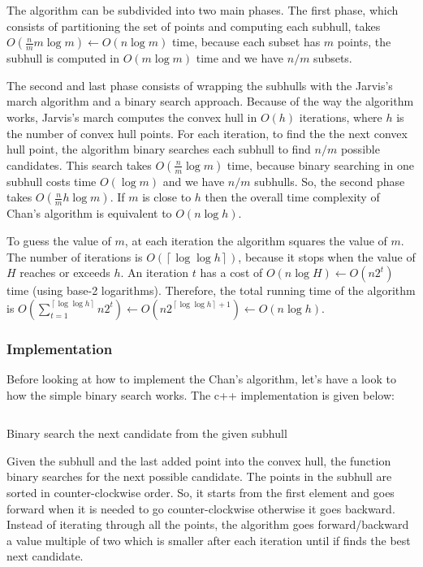 \documentclass{article}
\begin{document}
The algorithm can be subdivided into two main phases. The first phase, which consists of partitioning the set of points and computing each subhull, takes $O(\frac{n}{m}m\log{m}) \gets O(n\log{m})$ time, because each subset has $m$ points, the subhull is computed in $O(m\log{m})$ time and we have $n/m$ subsets.

The second and last phase consists of wrapping the subhulls with the Jarvis's march algorithm and a binary search approach. Because of the way the algorithm works, Jarvis's march computes the convex hull in $O(h)$ iterations, where $h$ is the number of convex hull points. For each iteration, to find the the next convex hull point, the algorithm binary searches each subhull to find $n/m$ possible candidates. This search takes $O(\frac{n}{m}\log{m})$ time, because binary searching in one subhull costs time $O(\log{m})$ and we have $n/m$ subhulls. So, the second phase takes $O(\frac{n}{m}h\log{m})$. If $m$ is close to $h$ then the overall time complexity of Chan's algorithm is equivalent to $O(n\log{h})$.

To guess the value of $m$, at each iteration the algorithm squares the value of $m$. The number of iterations is $O(\left\lceil \log{\log{h}} \right\rceil)$, because it stops when the value of $H$ reaches or exceeds $h$. An iteration $t$ has a cost of $O(n\log{H}) \gets O(n2^t)$ time (using base-2 logarithms). Therefore, the total running time of the algorithm is $O(\sum_{t=1}^{\left\lceil \log{\log{h}} \right\rceil} n2^t) \gets O(n2^{\left\lceil \log{\log{h}} \right\rceil + 1}) \gets O(n\log{h})$.

\subsubsection*{Implementation}
Before looking at how to implement the Chan's algorithm, let's have a look to how the simple binary search works. The c++ implementation is given below:
\begin{listing}[H]
    \inputminted[linenos]{cpp}{code/chan_binary_search.cpp}
    \caption{Binary search the next candidate from the given subhull}
\end{listing}
Given the subhull and the last added point into the convex hull, the function binary searches for the next possible candidate. The points in the subhull are sorted in counter-clockwise order. So, it starts from the first element and goes forward when it is needed to go counter-clockwise otherwise it goes backward. Instead of iterating through all the points, the algorithm goes forward/backward a value multiple of two which is smaller after each iteration until if finds the best next candidate.
\end{document}
